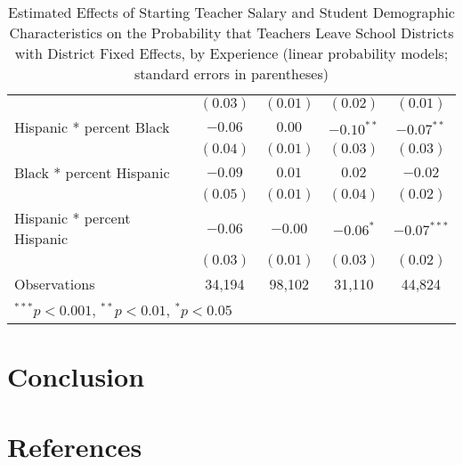 \documentclass[]{article}
\begin{document}
\begin{table}
\begin{center}
\begin{tabular}{l c c c c }
                                            & $(0.03)$     & $(0.01)$     & $(0.02)$     & $(0.01)$      \\
\quad Hispanic * percent Black              & $-0.06$      & $0.00$       & $-0.10^{**}$ & $-0.07^{**}$  \\
                                            & $(0.04)$     & $(0.01)$     & $(0.03)$     & $(0.03)$      \\
\quad Black * percent Hispanic              & $-0.09$      & $0.01$       & $0.02$       & $-0.02$       \\
                                            & $(0.05)$     & $(0.01)$     & $(0.04)$     & $(0.02)$      \\
\quad Hispanic * percent Hispanic           & $-0.06$      & $-0.00$      & $-0.06^{*}$  & $-0.07^{***}$ \\
                                            & $(0.03)$     & $(0.01)$     & $(0.03)$     & $(0.02)$      \\
\hline
Observations                                & 34,194        & 98,102        & 31,110        & 44,824         \\
\hline
\multicolumn{5}{l}{\scriptsize{$^{***}p<0.001$, $^{**}p<0.01$, $^*p<0.05$}}
\end{tabular}
\caption{Estimated Effects of Starting Teacher Salary and Student Demographic Characteristics on the Probability that Teachers Leave School Districts with District Fixed Effects, by Experience (linear probability models; standard errors in parentheses)}
\label{tbl:reg_lpm_fe}
\end{center}
\end{table}

\section{Conclusion}\label{conclusion}

\section{References}\label{references}
\end{document}
